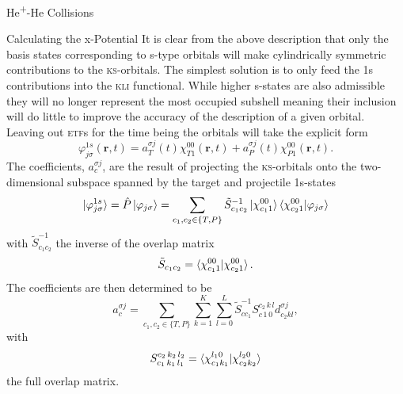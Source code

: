 \documentclass[a5paper, 9 pt]{extreport}
\begin{document}
\begin{chapter}{\texorpdfstring{He\textsuperscript{+}}{He+}-He Collisions \label{chap:hephe}}
\begin{section}{Calculating the x-Potential \label{sec:pot}}
      It is clear from the above description that only the basis states corresponding to s-type orbitals
      will make cylindrically symmetric contributions to the \textsc{ks}-orbitals. The simplest solution
      is to only feed the 1s contributions into the \textsc{kli} functional. While higher s-states are
      also admissible they will no longer represent the most occupied subshell meaning their inclusion
      will do little to improve the accuracy of the description of a given orbital. Leaving out
      \textsc{etf}s for the time being the orbitals will take the explicit form
      \begin{equation} \label{eq:1sonly}
         \varphi_{j \sigma}^{1s}(\mathbf{r},t) = a^{\sigma j}_T(t) \chi^{00}_{T1}(\mathbf{r},t)
                                               + a^{\sigma j}_P(t) \chi^{00}_{P1}(\mathbf{r},t).
      \end{equation}
      The coefficients, $a^{\sigma j}_c$, are the result of projecting the \textsc{ks}-orbitals onto the
      two-dimensional subspace spanned by the target and projectile 1s-states
      \begin{equation} \label{eq:proj}
         \ket{\varphi^{1s}_{j \sigma}} = \hat{P} \ket{\varphi_{j \sigma}}
                                       = \sum\limits_{c_1, c_2 \in \{T,P\}} \tilde{S}^{-1}_{c_1 c_2}
                                                      \ket{\chi^{00}_{c_1 1}}
                                                      \braket{\chi^{00}_{c_2 1}| \varphi_{j \sigma}}
      \end{equation}
      with $\tilde{S}^{-1}_{c_1 c_2}$ the inverse of the overlap matrix
      \begin{equation} \label{eq:overlap2d}
         \tilde{S}_{c_1 c_2} = \braket{ \chi^{00}_{c_1 1} | \chi^{00}_{c_2 1} }.
      \end{equation}
      The coefficients are then determined to be
      \begin{equation} \label{eq:coef}
         a^{\sigma j}_c = \sum\limits_{c_1, c_2 \in \{T,P\}} \sum\limits_{k = 1}^K
                          \sum\limits_{l = 0}^L \tilde{S}^{-1}_{c c_1} S^{c_2 \, k \, l}_{c \, 1 \, 0}
                             d^{\sigma j}_{c_2 k l},
      \end{equation}
      with
      \begin{equation} \label{eq:overlap}
         S_{c_1 \, k_1 \, l_1 }^{c_2 \, k_2 \, l_2 } =
            \braket{ \chi^{l_1 0}_{c_1 k_1} | \chi^{l_2 0}_{c_2 k_2} }
      \end{equation}
      the full overlap matrix.


\end{section}
\end{chapter}
\end{document}
